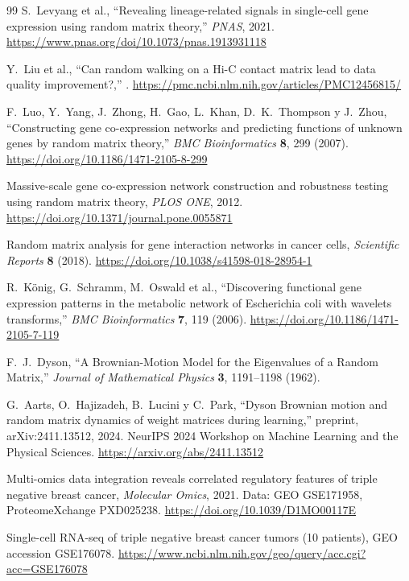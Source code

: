\documentclass[11pt]{article}
\begin{document}
\begin{thebibliography}{99}
S.~Levyang et al.,
\newblock ``Revealing lineage-related signals in single-cell gene expression using random matrix theory,''
\newblock \emph{PNAS}, 2021.
\newblock \url{https://www.pnas.org/doi/10.1073/pnas.1913931118}

Y.~Liu et al.,
\newblock ``Can random walking on a Hi-C contact matrix lead to data quality improvement?,''
.
\newblock \url{https://pmc.ncbi.nlm.nih.gov/articles/PMC12456815/}

F.~Luo, Y.~Yang, J.~Zhong, H.~Gao, L.~Khan, D.~K.~Thompson y J.~Zhou,
\newblock ``Constructing gene co-expression networks and predicting functions of unknown genes by random matrix theory,''
\newblock \emph{BMC Bioinformatics} \textbf{8}, 299 (2007).
\newblock \url{https://doi.org/10.1186/1471-2105-8-299}

Massive-scale gene co-expression network construction and robustness testing using random matrix theory,
\newblock \emph{PLOS ONE}, 2012.
\newblock \url{https://doi.org/10.1371/journal.pone.0055871}

Random matrix analysis for gene interaction networks in cancer cells,
\newblock \emph{Scientific Reports} \textbf{8} (2018).
\newblock \url{https://doi.org/10.1038/s41598-018-28954-1}

R.~König, G.~Schramm, M.~Oswald et al.,
\newblock ``Discovering functional gene expression patterns in the metabolic network of Escherichia coli with wavelets transforms,''
\newblock \emph{BMC Bioinformatics} \textbf{7}, 119 (2006).
\newblock \url{https://doi.org/10.1186/1471-2105-7-119}

F.~J.~Dyson,
\newblock ``A Brownian-Motion Model for the Eigenvalues of a Random Matrix,''
\newblock \emph{Journal of Mathematical Physics} \textbf{3}, 1191--1198 (1962).

G.~Aarts, O.~Hajizadeh, B.~Lucini y C.~Park,
\newblock ``Dyson Brownian motion and random matrix dynamics of weight matrices during learning,''
\newblock preprint, arXiv:2411.13512, 2024. NeurIPS 2024 Workshop on Machine Learning and the Physical Sciences.
\newblock \url{https://arxiv.org/abs/2411.13512}

Multi-omics data integration reveals correlated regulatory features of triple negative breast cancer,
\newblock \emph{Molecular Omics}, 2021. Data: GEO GSE171958, ProteomeXchange PXD025238.
\newblock \url{https://doi.org/10.1039/D1MO00117E}

Single-cell RNA-seq of triple negative breast cancer tumors (10 patients),
\newblock GEO accession GSE176078.
\newblock \url{https://www.ncbi.nlm.nih.gov/geo/query/acc.cgi?acc=GSE176078}

\end{thebibliography}
\end{document}
